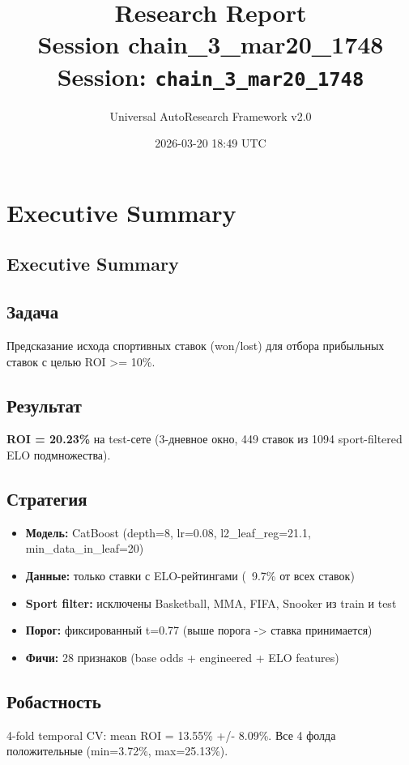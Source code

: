 \documentclass[12pt,a4paper]{article}
\title{
    \Large\textbf{Research Report}\\[0.5em]
    \large Session chain\_3\_mar20\_1748\\[0.3em]
    \normalsize Session: \texttt{chain\_3\_mar20\_1748}
}
\author{Universal AutoResearch Framework v2.0}
\date{2026-03-20 18:49 UTC}
\begin{document}
\maketitle
\tableofcontents
\newpage


\section{Executive Summary}

\subsection{Executive Summary}

\subsection{Задача}
Предсказание исхода спортивных ставок (won/lost) для отбора прибыльных ставок с целью ROI >= 10\%.

\subsection{Результат}
\textbf{ROI = 20.23\%} на test-сете (3-дневное окно, 449 ставок из 1094 sport-filtered ELO подмножества).

\subsection{Стратегия}
\begin{itemize}
  \item \textbf{Модель:} CatBoost (depth=8, lr=0.08, l2\_leaf\_reg=21.1, min\_data\_in\_leaf=20)
  \item \textbf{Данные:} только ставки с ELO-рейтингами (~9.7\% от всех ставок)
  \item \textbf{Sport filter:} исключены Basketball, MMA, FIFA, Snooker из train и test
  \item \textbf{Порог:} фиксированный t=0.77 (выше порога -> ставка принимается)
  \item \textbf{Фичи:} 28 признаков (base odds + engineered + ELO features)
\end{itemize}

\subsection{Робастность}
4-fold temporal CV: mean ROI = 13.55\% +/- 8.09\%. Все 4 фолда положительные (min=3.72\%, max=25.13\%).
\end{document}
